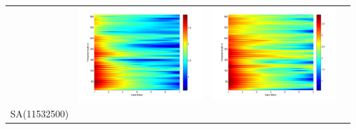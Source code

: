 \documentclass[11pt]{article}
\begin{document}
\begin{table}[H]
{\begin{tabular}{cccc}
&\begin{minipage}{.3\textwidth}\includegraphics[width=\linewidth]{resultgraph/AU/05585000pep_rela.png}\end{minipage}
&\begin{minipage}{.3\textwidth}\includegraphics[width=\linewidth]{resultgraph/AU/05585000pepq_rela.png}\end{minipage}
\\
SA(11532500)

\end{tabular}}
\end{table}
\end{document}
